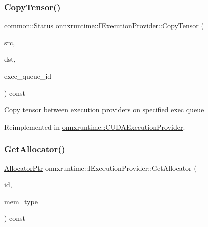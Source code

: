 \subsubsection{\texorpdfstring{Copy\+Tensor()}{CopyTensor()}\hspace{0.1cm}{\footnotesize\ttfamily [2/2]}}
{\footnotesize\ttfamily \mbox{\hyperlink{classonnxruntime_1_1common_1_1Status}{common\+::\+Status}} onnxruntime\+::\+I\+Execution\+Provider\+::\+Copy\+Tensor (\begin{DoxyParamCaption}\item[{const \mbox{\hyperlink{classonnxruntime_1_1Tensor}{Tensor}} \&}]{src,  }\item[{\mbox{\hyperlink{classonnxruntime_1_1Tensor}{Tensor}} \&}]{dst,  }\item[{int}]{exec\+\_\+queue\+\_\+id }\end{DoxyParamCaption}) const\hspace{0.3cm}{\ttfamily [virtual]}}

Copy tensor between execution providers on specified exec queue 

Reimplemented in \mbox{\hyperlink{classonnxruntime_1_1CUDAExecutionProvider_a7238cead30fe69540b3df62e6913d579}{onnxruntime\+::\+C\+U\+D\+A\+Execution\+Provider}}.

\mbox{\label{classonnxruntime_1_1IExecutionProvider_ab4911f5441a3bd940b0384bc5a334b92}} 
\subsubsection{\texorpdfstring{Get\+Allocator()}{GetAllocator()}}
{\footnotesize\ttfamily \mbox{\hyperlink{namespaceonnxruntime_a6cdac724c5dcefded3a63f08dae58fda}{Allocator\+Ptr}} onnxruntime\+::\+I\+Execution\+Provider\+::\+Get\+Allocator (\begin{DoxyParamCaption}\item[{int}]{id,  }\item[{\mbox{\hyperlink{allocator__info_8h_add3f8ee3ff93395704abae71c30cab18}{O\+N\+N\+X\+Runtime\+Mem\+Type}}}]{mem\+\_\+type }\end{DoxyParamCaption}) const\hspace{0.3cm}{\ttfamily [virtual]}}

